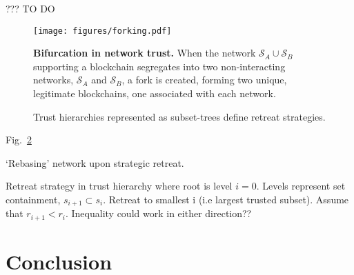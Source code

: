 \documentclass[twocolumn, aps, amsmath, amssymb, nofootinbib, superscriptaddress, longbibliography, floatfix, eqsecnum, rmp]{revtex4-2}
\begin{document}
??? TO DO

\begin{figure}[!htb]
\texttt{[image: figures/forking.pdf]}
\caption{\textbf{Bifurcation in network trust.} When the network $\mathcal{S}_A\cup\mathcal{S}_B$ supporting a blockchain segregates into two non-interacting networks, $\mathcal{S}_A$ and $\mathcal{S}_B$, a fork is created, forming two unique, legitimate blockchains, one associated with each network.} \label{fig:forking}	
\end{figure}

\begin{figure}[!htb]
\caption{Trust hierarchies represented as subset-trees define retreat strategies.} \label{fig:subset_tree}
\end{figure}

Fig.~\ref{fig:subset_tree}

`Rebasing' network upon strategic retreat.

Retreat strategy in trust hierarchy where root is level $i=0$. Levels represent set containment, $s_{i+1}\subset s_i$. Retreat to smallest i (i.e largest trusted subset). Assume that $r_{i+1}<r_i$. Inequality could work in either direction??

\section{Conclusion} \label{sec:conclusion}

%

\begin{acknowledgments}
\end{acknowledgments}


\end{document}
